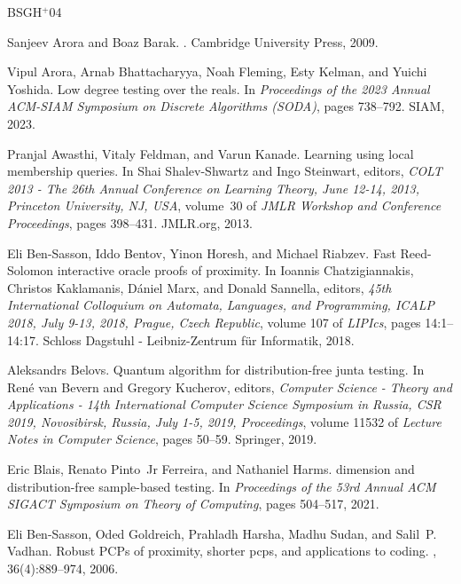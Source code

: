 \documentclass[10pt,a4paper]{article}
\begin{document}
\newcommand{\etalchar}[1]{$^{#1}$}
\begin{thebibliography}{BSGH{\etalchar{+}}04}

Sanjeev Arora and Boaz Barak.
.
\newblock Cambridge University Press, 2009.

\bibitem[ABF{\etalchar{+}}23]{ABFKY23}
Vipul Arora, Arnab Bhattacharyya, Noah Fleming, Esty Kelman, and Yuichi
  Yoshida.
\newblock Low degree testing over the reals.
\newblock In {\em Proceedings of the 2023 Annual ACM-SIAM Symposium on Discrete
  Algorithms (SODA)}, pages 738--792. SIAM, 2023.

Pranjal Awasthi, Vitaly Feldman, and Varun Kanade.
\newblock Learning using local membership queries.
\newblock In Shai Shalev{-}Shwartz and Ingo Steinwart, editors, {\em {COLT}
  2013 - The 26th Annual Conference on Learning Theory, June 12-14, 2013,
  Princeton University, NJ, {USA}}, volume~30 of {\em {JMLR} Workshop and
  Conference Proceedings}, pages 398--431. JMLR.org, 2013.

Eli Ben{-}Sasson, Iddo Bentov, Yinon Horesh, and Michael Riabzev.
\newblock Fast {Reed}-{Solomon} interactive oracle proofs of proximity.
\newblock In Ioannis Chatzigiannakis, Christos Kaklamanis, D{\'{a}}niel Marx,
  and Donald Sannella, editors, {\em 45th International Colloquium on Automata,
  Languages, and Programming, {ICALP} 2018, July 9-13, 2018, Prague, Czech
  Republic}, volume 107 of {\em LIPIcs}, pages 14:1--14:17. Schloss Dagstuhl -
  Leibniz-Zentrum f{\"{u}}r Informatik, 2018.

Aleksandrs Belovs.
\newblock Quantum algorithm for distribution-free junta testing.
\newblock In Ren{\'{e}} van Bevern and Gregory Kucherov, editors, {\em Computer
  Science - Theory and Applications - 14th International Computer Science
  Symposium in Russia, {CSR} 2019, Novosibirsk, Russia, July 1-5, 2019,
  Proceedings}, volume 11532 of {\em Lecture Notes in Computer Science}, pages
  50--59. Springer, 2019.

Eric Blais, Renato Pinto~Jr Ferreira, and Nathaniel Harms.
 dimension and distribution-free sample-based testing.
\newblock In {\em Proceedings of the 53rd Annual ACM SIGACT Symposium on Theory
  of Computing}, pages 504--517, 2021.

\bibitem[BGH{\etalchar{+}}06]{BGH06}
Eli Ben{-}Sasson, Oded Goldreich, Prahladh Harsha, Madhu Sudan, and Salil~P.
  Vadhan.
\newblock Robust {PCP}s of proximity, shorter pcps, and applications to coding.
, 36(4):889--974, 2006.


\end{thebibliography}
\end{document}
